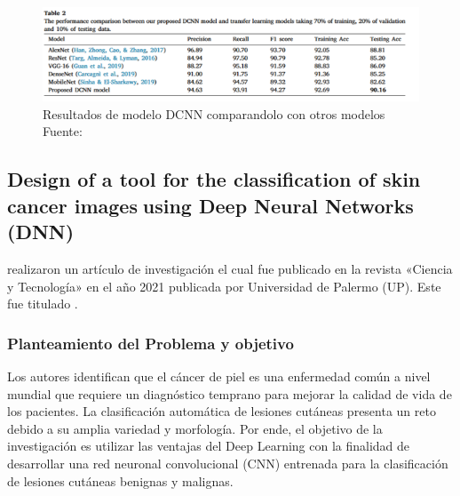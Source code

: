 \begin{figure}[h]
	\begin{center}
		\includegraphics[width=1\textwidth]{2/figuras/Problematica_An_enhanced_tecniques_imagen_01.png}
		\caption{Resultados de modelo DCNN comparandolo con otros modelos Fuente: \cite{ali_2021enhanced}}
		\label{1:fig}
	\end{center}
\end{figure}




\subsection{Design of a tool for the classification of skin cancer imagesusing Deep Neural Networks (DNN) \citep*{vargas_2021diseno}}

\citeauthor{vargas_2021diseno} realizaron un artículo de investigación el cual fue publicado en la revista «Ciencia y Tecnología» en el año 2021 publicada por Universidad de Palermo (UP). Este fue titulado .


\subsubsection{Planteamiento del Problema y objetivo}
Los autores identifican que el cáncer de piel es una enfermedad común a nivel mundial que requiere un diagnóstico temprano para mejorar la calidad de vida de los pacientes. La clasificación automática de lesiones cutáneas presenta un reto debido a su amplia variedad y morfología. Por ende, el objetivo de la investigación es utilizar las ventajas del Deep Learning con la finalidad de desarrollar una red neuronal convolucional (CNN) entrenada para la clasificación de lesiones cutáneas benignas y malignas.

